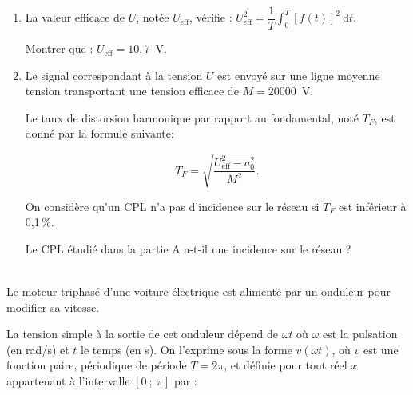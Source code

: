 \documentclass[11pt,a4paper]{article}
\newcommand{\cadreblanc}[1]{%
\medskip\framebox[\linewidth][c]{%
\rule{0mm}{#1mm}}\par
\medskip}
\begin{document}
\begin{enumerate}
On admet que la fonction $f$ est paire, périodique de période $T$, développable en série de Fourier et vérifie, pour tout réel $t$ :

\[f(t) = a_0 + \displaystyle\sum_{n=1}^{+ \infty} \left(a_n \cos (n \omega t) + b_n \sin(n\omega t) \right)\quad \text{avec}\: \omega = \dfrac{2\pi}{T}.\]

	\begin{enumerate}
		\item Quelle est la valeur de $b_n$ pour tout entier $n \geqslant 1$ ? Justifier. \\
		\cadreblanc{10}
		\item $a_0 = \dfrac{1}{T}\displaystyle\int_0^{T} f(t)\:\text{d}t$. Justifier que $a_0 = 9,6$.\\
		\cadreblanc{20}
	\end{enumerate}
\item La valeur efficace de $U$, notée $U_{\text{eff}}$, vérifie : $U^2_{\text{eff}} = \dfrac{1}{T}\displaystyle\int_0^{T} [f(t)]^2\: \text{d}t$. 

Montrer que : $U_{\text{eff}} = 10,7$~V.\\
\cadreblanc{20}
\item Le signal correspondant à la tension $U$ est envoyé sur une ligne moyenne tension transportant une tension efficace de $M = 20 000$~V.

Le taux de distorsion harmonique par rapport au fondamental, noté $T_F$, est donné par la formule suivante:

\[T_F = \sqrt{\dfrac{U^2_{\text{eff}} - a_0^2}{M^2}}.\]

On considère qu'un CPL n'a pas d'incidence sur le réseau si $T_F$ est inférieur à 0,1\,\%. 

Le CPL étudié dans la partie A a-t-il une incidence sur le réseau ?\\
\cadreblanc{30}
\end{enumerate}


\newpage 


\\[2mm]
Le moteur triphasé d'une voiture électrique est alimenté par un onduleur pour modifier sa vitesse. 

La tension simple à la sortie de cet onduleur dépend de $\omega t$  où $\omega$ est la pulsation (en rad/s) et $t$ le temps (en s). On l'exprime sous la forme $v(\omega t)$, où $v$ est une fonction paire, périodique de période $T = 2\pi$, et définie pour tout réel $x$ appartenant à l'intervalle $[0~;~\pi]$ par :
\end{document}
